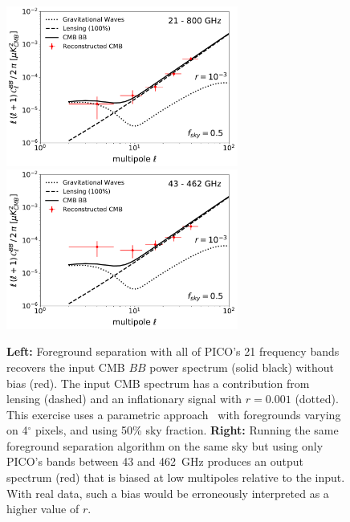 \documentclass[PICOReport.tex]{subfiles}
\begin{document}
\begin{figure}
\centering
\includegraphics[width=3in]{images/commander_pico_baseline.pdf}
\hspace{-0.0in}
\includegraphics[width=3in]{images/commander_pico_descoped.pdf}
\vspace{-0.1in}
\caption{\captiontext
{\bf Left:} Foreground separation with all of PICO's 21 frequency bands recovers the input CMB $BB$ power spectrum (solid black) without bias (red). The input CMB spectrum has a contribution from lensing (dashed) and an inflationary signal with $r=0.001$ (dotted). This exercise uses a parametric approach~\citep{eriksen/etal:2008} with foregrounds varying on 4$^\circ$ pixels, and using 50\% sky fraction. {\bf Right:} Running the same foreground separation algorithm on the same sky but using only PICO's bands between 43 and 462~GHz produces an output spectrum (red) that is biased at low multipoles relative to the input. With real data, such a bias would be erroneously interpreted as a higher value of $r$. 
\label{fig:commander}}
\vspace{-0.1in}
\end{figure}
\end{document}
